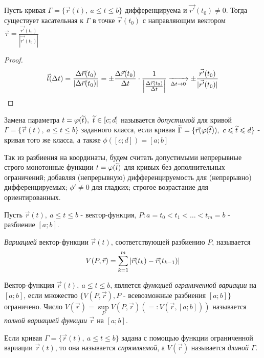 \begin{lemma}
	Пусть кривая $\Gamma = \{\vec{r}(t),\ a \le t \le b\}$ дифференцируема и $\vec{r'}(t_0) \neq 0$. Тогда существует касательная к $\Gamma$ в точке $\vec{r}(t_0)$ с направляющим вектором $\vec{\tau} = \frac{\vec{r'}(t_0)}{|\vec{r'}(t_0)|}$
\end{lemma}

\begin{proof}
	\[
		\vec{l}(\Delta t) = \frac{\Delta\vec{r}(t_0)}{|\Delta\vec{r}(t_0)|} = \pm \frac{\Delta\vec{r}(t_0)}{\Delta t} \cdot \frac{1}{\left|\frac{\Delta\vec{r}(t_0)}{\Delta t}\right|} \xrightarrow[\Delta t \to 0]{} \pm \frac{\vec{r'}(t_0)}{|\vec{r'}(t_0)|}
	\]
\end{proof}

\begin{definition}
	Замена параметра $t = \varphi(\widetilde{t}),\ \widetilde{t} \in [c; d]$ называется \textit{допустимой} для кривой $\Gamma = \{\vec{r}(t),\ a \le t \le b\}$ заданного класса, если кривая $\widetilde{\Gamma} = \{\vec{r}(\varphi(\widetilde{t})),\ c \leqslant \widetilde{t} \leqslant d\}$ - кривая того же класса, а также $\phi([c; d]) = [a; b]$
	
	Так из разбиения на координаты, будем считать допустимыми непрерывные строго монотонные функции $t = \varphi(\widetilde{t})$ для кривых без дополнительных ограничений; добавляя (непрерывную) дифференцируемость для (непрерывно) дифференцируемых; $\phi' \neq 0$ для гладких; строгое возрастание для ориентированных.
\end{definition}

\begin{definition}
	Пусть $\vec{r}(t),\ a \le t \le b$ - вектор-функция, $P: a = t_0 < t_1 < \ldots < t_m = b$ - разбиение $[a; b]$.
	
	\textit{Вариацией} вектор-функции $\vec{r}(t)$, соответствующей разбиению $P$, называется 
	\[
		V(P, \vec{r}) = \sum\limits_{k = 1}^m |\vec{r}(t_k) - \vec{r}(t_{k - 1})|
	\]
\end{definition}

\begin{definition}
	Вектор-функция $\vec{r}(t),\ a \le t \le b$, является \textit{функцией ограниченной вариации} на $[a; b]$, если множество $\{V(P, \vec{r}), P \text{ - всевозможные разбиения }[a; b]\}$ ограничено. Число $V(\vec{r}) = \sup\limits_{P} V(P, \vec{r})\left(=: V(\vec{r}, [a; b])\right)$ называется \textit{полной вариацией функции} $\vec{r}$ на $[a; b]$.
\end{definition}

\begin{definition}
	Если кривая $\Gamma = \{\vec{r}(t),\ a \le t \le b\}$ задана с помощью функции ограниченной вариации $\vec{r}(t)$, то она называется \textit{спрямляемой}, а $V(\vec{r})$ называется \textit{длиной} $\Gamma$.
\end{definition}

